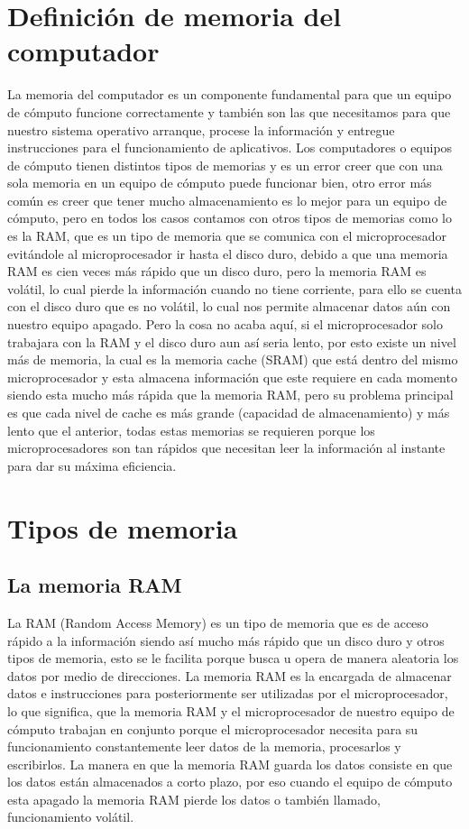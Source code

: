 \documentclass{article}
\begin{document}
\section{Definición de memoria del computador}
La memoria del computador es un componente fundamental para que un equipo de cómputo funcione correctamente y también son las que necesitamos para que nuestro sistema operativo arranque, procese la información y entregue instrucciones para el funcionamiento de aplicativos. Los computadores o equipos de cómputo tienen distintos tipos de memorias y es un error creer que con una sola memoria en un equipo de cómputo puede funcionar bien, otro error más común es creer que tener mucho almacenamiento es lo mejor para un equipo de cómputo, pero en todos los casos contamos con otros tipos de memorias como lo es la RAM, que es un tipo de memoria que se comunica con el microprocesador evitándole al microprocesador ir hasta el disco duro, debido a que una memoria RAM es cien veces más rápido que un disco duro, pero la memoria RAM es volátil, lo cual pierde la información cuando no tiene corriente, para ello se cuenta con el disco duro que es no volátil, lo cual nos permite almacenar datos aún con nuestro equipo apagado. Pero la cosa no acaba aquí, si el microprocesador solo trabajara con la RAM y el disco duro aun así seria lento, por esto existe un nivel más de memoria, la cual es la memoria cache (SRAM) que está dentro del mismo microprocesador y esta almacena información que este requiere en cada momento siendo esta  mucho más rápida que la memoria RAM, pero su problema principal es que cada nivel de cache es más grande (capacidad de almacenamiento) y más lento que el anterior, todas estas memorias se requieren porque los microprocesadores son tan rápidos que necesitan leer la información al instante para dar su máxima eficiencia.

\section{Tipos de memoria}
\subsection{La memoria RAM}
La RAM (Random Access Memory) es un tipo de memoria que es de acceso rápido a la información siendo así mucho más rápido que un disco duro y otros tipos de memoria, esto se le facilita porque busca u opera de manera aleatoria los datos por medio de direcciones. La memoria RAM es la encargada de almacenar datos e instrucciones para posteriormente ser utilizadas por el microprocesador, lo que significa, que la memoria RAM y el microprocesador de nuestro equipo de cómputo trabajan en conjunto porque el microprocesador necesita para su funcionamiento constantemente leer datos de la memoria, procesarlos y escribirlos. La manera en que la memoria RAM guarda los datos consiste en que los datos están almacenados a corto plazo, por eso cuando el equipo de cómputo esta apagado la memoria RAM pierde los datos o también llamado, funcionamiento volátil. \cite{MCwebsite}
\end{document}
